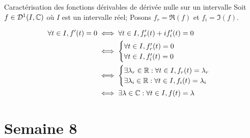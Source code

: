 \documentclass{article}
\renewenvironment{question_kholle}[2][ ]
{
	\subsection{\texorpdfstring{#2}{}}
	\notblank{#1}
	{
		\noindent #1
		\bigbreak
	}
	{}
	\begin{proof}
}
{
	\end{proof}
}
\begin{document}
\begin{question_kholle}{Caractérisation des fonctions dérivables de dérivée nulle sur un intervalle}
	Soit $f \in \mathcal D ^1 (I, \mathbb C)$ où $I$ est un intervalle réel;
	Posons $f_r = \Re (f)$ et $f_i = \Im(f)$.

	\begin{align*}
		\forall t \in I, f'(t) = 0 & \iff \forall t \in I, f_r'(t) + i f_i'(t) = 0                        \\
		                           & \iff \begin{cases}
			                                  \forall t \in I, f_r'(t) = 0 \\
			                                  \forall t \in I, f_i'(t) = 0
		                                  \end{cases}                                    \\
		                           & \iff \begin{cases}
			                                  \exists \lambda_r \in \mathbb R : \forall t \in I,  f_r(t) = \lambda_r \\
			                                  \exists \lambda_i \in \mathbb R : \forall t \in I,  f_i(t) = \lambda_i
		                                  \end{cases} \\
		                           & \iff \exists \lambda \in \mathbb C : \forall t \in I,  f(t) = \lambda
	\end{align*}
\end{question_kholle}

\pagebreak\section{Semaine 8}
\end{document}
